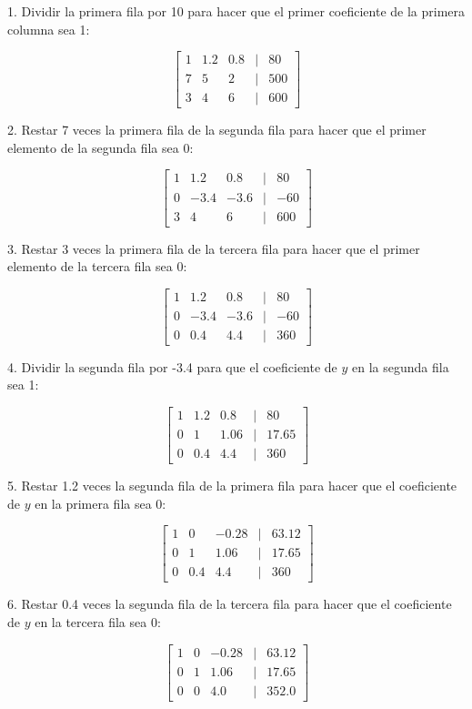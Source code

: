 \documentclass[]{article}
\begin{document}
	1. Dividir la primera fila por 10 para hacer que el primer coeficiente de la primera columna sea 1:
	
	\[
	\begin{bmatrix}
		1 & 1.2 & 0.8 & | & 80 \\
		7 & 5 & 2 & | & 500 \\
		3 & 4 & 6 & | & 600
	\end{bmatrix}
	\]
	
	2. Restar 7 veces la primera fila de la segunda fila para hacer que el primer elemento de la segunda fila sea 0:
	
	\[
	\begin{bmatrix}
		1 & 1.2 & 0.8 & | & 80 \\
		0 & -3.4 & -3.6 & | & -60 \\
		3 & 4 & 6 & | & 600
	\end{bmatrix}
	\]
	
	3. Restar 3 veces la primera fila de la tercera fila para hacer que el primer elemento de la tercera fila sea 0:
	
	\[
	\begin{bmatrix}
		1 & 1.2 & 0.8 & | & 80 \\
		0 & -3.4 & -3.6 & | & -60 \\
		0 & 0.4 & 4.4 & | & 360
	\end{bmatrix}
	\]
	
	4. Dividir la segunda fila por -3.4 para que el coeficiente de \(y\) en la segunda fila sea 1:
	
	\[
	\begin{bmatrix}
		1 & 1.2 & 0.8 & | & 80 \\
		0 & 1 & 1.06 & | & 17.65 \\
		0 & 0.4 & 4.4 & | & 360
	\end{bmatrix}
	\]
	
	5. Restar 1.2 veces la segunda fila de la primera fila para hacer que el coeficiente de \(y\) en la primera fila sea 0:
	
	\[
	\begin{bmatrix}
		1 & 0 & -0.28 & | & 63.12 \\
		0 & 1 & 1.06 & | & 17.65 \\
		0 & 0.4 & 4.4 & | & 360
	\end{bmatrix}
	\]
	
	6. Restar 0.4 veces la segunda fila de la tercera fila para hacer que el coeficiente de \(y\) en la tercera fila sea 0:
	
	\[
	\begin{bmatrix}
		1 & 0 & -0.28 & | & 63.12 \\
		0 & 1 & 1.06 & | & 17.65 \\
		0 & 0 & 4.0 & | & 352.0
	\end{bmatrix}
	\]
	
\end{document}

